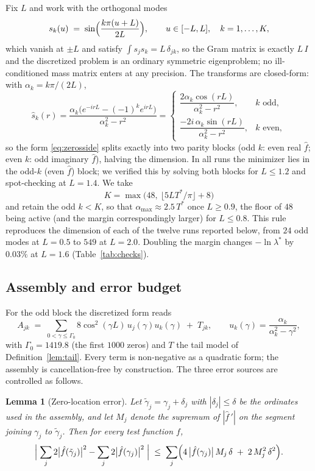 ﻿\documentclass[11pt]{article}
\newtheorem{lemma}[theorem]{Lemma}
\newcommand{\lmin}{\lambda^{*}}
\newcommand{\Tstar}{T^{*}}
\newcommand{\fhat}{\hat f}
\begin{document}
Fix $L$ and work with the orthogonal modes
\[
  s_k(u)\;=\;\sin\Bigl(\frac{k\pi(u+L)}{2L}\Bigr),\qquad
  u\in[-L,L],\quad k=1,\dots,K,
\]
which vanish at $\pm L$ and satisfy $\int s_js_k=L\,\delta_{jk}$, so
the Gram matrix is exactly $L\,I$ and the discretized problem is an
ordinary symmetric eigenproblem; no ill-conditioned mass matrix enters
at any precision.  The transforms are closed-form: with
$\alpha_k=k\pi/(2L)$,
\begin{equation}\label{eq:shat}
  \hat s_k(r)
  =\frac{\alpha_k\bigl(e^{-irL}-(-1)^k e^{irL}\bigr)}{\alpha_k^2-r^2}
  =\begin{cases}
    \dfrac{2\alpha_k\cos(rL)}{\alpha_k^2-r^2}, & k \text{ odd},\\[2ex]
    \dfrac{-2i\,\alpha_k\sin(rL)}{\alpha_k^2-r^2}, & k \text{ even},
  \end{cases}
\end{equation}
so the form \eqref{eq:zerosside} splits exactly into two parity blocks
(odd $k$: even real $\fhat$; even $k$: odd imaginary $\fhat$), halving
the dimension.  In all runs the minimizer lies in the odd-$k$ (even
$\fhat$) block; we verified this by solving both blocks for $L\le1.2$
and spot-checking at $L=1.4$.  We take
\[
K=\max\bigl(48,\ \lfloor 5L\Tstar/\pi\rfloor+8\bigr)
\]
and retain the odd $k<K$, so that $\alpha_{\max}\approx2.5\,\Tstar$
once $L\ge0.9$, the floor of $48$ being active (and the margin
correspondingly larger) for $L\le0.8$.  This rule reproduces the
dimension of each of the twelve runs reported below, from $24$ odd
modes at $L=0.5$ to $549$ at $L=2.0$.  Doubling the margin changes
$-\ln\lmin$ by $0.03\%$ at $L=1.6$ (Table~\ref{tab:checks}).

\subsection{Assembly and error budget}

For the odd block the discretized form reads
\[
  A_{jk}\;=\;\sum_{0<\gamma\le\Gamma_0} 8\cos^2(\gamma L)\,
  u_j(\gamma)u_k(\gamma)\;+\;T_{jk},
  \qquad u_k(\gamma)=\frac{\alpha_k}{\alpha_k^2-\gamma^2},
\]
with $\Gamma_0=1419.8$ (the first $1000$ zeros) and $T$ the tail
model of Definition~\ref{lem:tail}.  Every term is non-negative as a
quadratic form; the assembly is cancellation-free by construction.
The three error sources are controlled as follows.

\begin{lemma}[Zero-location error]\label{lem:zeros}
Let $\tilde\gamma_j=\gamma_j+\delta_j$ with $|\delta_j|\le\delta$ be the
ordinates used in the assembly, and let $M_j$ denote the supremum of
$|\fhat\,'|$ on the segment joining $\gamma_j$ to $\tilde\gamma_j$.
Then for every test function $f$,
\[
  \Bigl|\;\sum_j 2\bigl|\fhat(\tilde\gamma_j)\bigr|^{2}
        -\sum_j 2\bigl|\fhat(\gamma_j)\bigr|^{2}\;\Bigr|
  \;\le\;\sum_j\Bigl(4\,\bigl|\fhat(\gamma_j)\bigr|\,M_j\,\delta
         \;+\;2\,M_j^{2}\,\delta^{2}\Bigr).
\]
\end{lemma}
\end{document}

